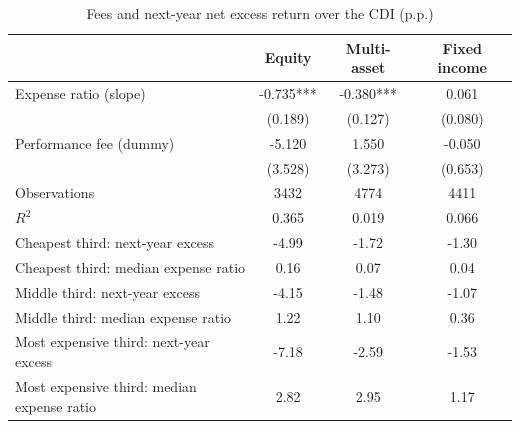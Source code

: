 \begin{table}[htbp]\centering
\caption{Fees and next-year net excess return over the CDI (p.p.)}
\begin{tabular}{lccc}
\toprule
& Equity & Multi-asset & Fixed income \\
\midrule
Expense ratio (slope) & -0.735*** & -0.380*** & 0.061 \\
 & (0.189) & (0.127) & (0.080) \\
Performance fee (dummy) & -5.120 & 1.550 & -0.050 \\
 & (3.528) & (3.273) & (0.653) \\
Observations & 3432 & 4774 & 4411 \\
$R^2$ & 0.365 & 0.019 & 0.066 \\
\midrule
Cheapest third: next-year excess & -4.99 & -1.72 & -1.30 \\
Cheapest third: median expense ratio & 0.16 & 0.07 & 0.04 \\
Middle third: next-year excess & -4.15 & -1.48 & -1.07 \\
Middle third: median expense ratio & 1.22 & 1.10 & 0.36 \\
Most expensive third: next-year excess & -7.18 & -2.59 & -1.53 \\
Most expensive third: median expense ratio & 2.82 & 2.95 & 1.17 \\
\bottomrule
\end{tabular}
\end{table}

